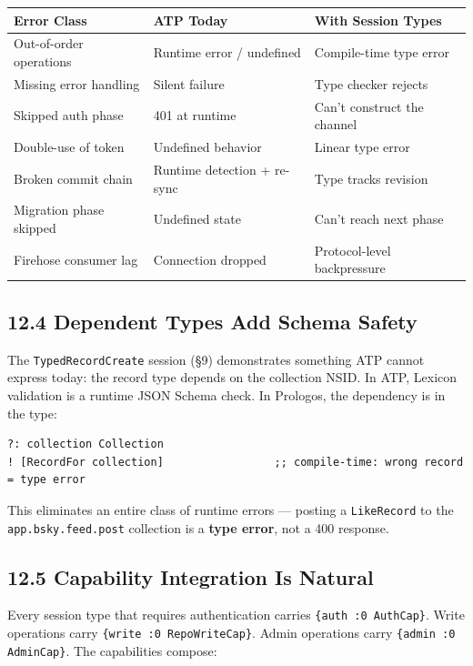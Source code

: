 \documentclass[11pt]{article}
\begin{document}
\begin{center}
\begin{tabular}{lll}
Error Class & ATP Today & With Session Types\\
\hline
Out-of-order operations & Runtime error / undefined & Compile-time type error\\
Missing error handling & Silent failure & Type checker rejects\\
Skipped auth phase & 401 at runtime & Can't construct the channel\\
Double-use of token & Undefined behavior & Linear type error\\
Broken commit chain & Runtime detection + re-sync & Type tracks revision\\
Migration phase skipped & Undefined state & Can't reach next phase\\
Firehose consumer lag & Connection dropped & Protocol-level backpressure\\
\end{tabular}
\end{center}
\subsection{12.4 Dependent Types Add Schema Safety}
\label{sec:orgd77b420}

The \texttt{TypedRecordCreate} session (§9) demonstrates something ATP cannot
express today: the record type depends on the collection NSID. In ATP,
Lexicon validation is a runtime JSON Schema check. In Prologos, the
dependency is in the type:

\begin{verbatim}
?: collection Collection
! [RecordFor collection]                 ;; compile-time: wrong record = type error
\end{verbatim}

This eliminates an entire class of runtime errors — posting a \texttt{LikeRecord}
to the \texttt{app.bsky.feed.post} collection is a \textbf{type error}, not a 400
response.
\subsection{12.5 Capability Integration Is Natural}
\label{sec:orgb0d377e}

Every session type that requires authentication carries \texttt{\{auth :0 AuthCap\}}.
Write operations carry \texttt{\{write :0 RepoWriteCap\}}. Admin operations carry
\texttt{\{admin :0 AdminCap\}}. The capabilities compose:
\end{document}
